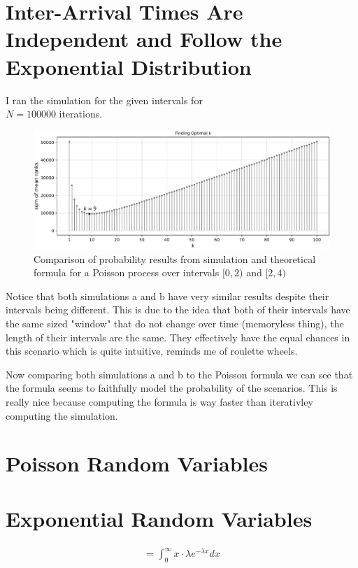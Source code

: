 \documentclass[twocolumn]{article}
\begin{document}
\section{Inter-Arrival Times Are Independent and Follow the Exponential Distribution}
I ran the simulation for the given intervals for \\$N=100000$ iterations. 
\begin{figure}[H]
	\centering
	\includegraphics[width=1\linewidth]{../drawings/p2}
	\caption{Comparison of probability results from simulation and theoretical formula for a Poisson process over intervals $[0,2)$ and $[2,4)$}
\end{figure}

Notice that both simulations a and b have very similar results despite their intervals being different. This is due to the idea that both of their intervals have the same sized "window" that do not change over time (memoryless thing), the length of their intervals are the same. They effectively have the equal chances in this scenario which is quite intuitive, reminds me of roulette wheels.

Now comparing both simulations a and b to the Poisson formula we can see that the formula seems to faithfully model the probability of the scenarios. This is really nice because computing the formula is way faster than iterativley computing the simulation.


\section{Poisson Random Variables}
\section{Exponential Random Variables}

\vspace{-5pt}

\begin{align*}
	= \int_{0}^{\infty} x \cdot \lambda e^{-\lambda x} dx
\end{align*}
\end{document}
